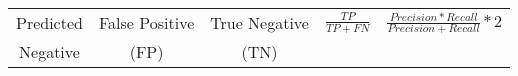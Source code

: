 \documentclass[11pt,]{article}
\begin{document}
\begin{longtable}[]{@{}ccccc@{}}
\begin{minipage}[t]{0.17\columnwidth}
Predicted\strut
\end{minipage} & \begin{minipage}[t]{0.17\columnwidth}\centering
False Positive\strut
\end{minipage} & \begin{minipage}[t]{0.17\columnwidth}\centering
True Negative\strut
\end{minipage} & \begin{minipage}[t]{0.17\columnwidth}\centering
\(\frac{TP}{TP + FN}\)\strut
\end{minipage} & \begin{minipage}[t]{0.17\columnwidth}\centering
\(\frac{Precision * Recall}{Precision + Recall}*2\)\strut
\end{minipage}\tabularnewline
\begin{minipage}[t]{0.17\columnwidth}\centering
Negative\strut
\end{minipage} & \begin{minipage}[t]{0.17\columnwidth}\centering
(FP)\strut
\end{minipage} & \begin{minipage}[t]{0.17\columnwidth}\centering
(TN)\strut
\end{minipage} & \begin{minipage}[t]{0.17\columnwidth}\centering
\strut
\end{minipage} & \begin{minipage}[t]{0.17\columnwidth}\centering
\strut
\end{minipage}\tabularnewline
\bottomrule
\end{longtable}





\newpage
\singlespacing 

\end{document}
